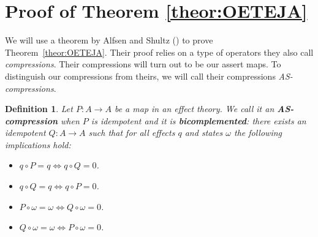 \documentclass[b5paper,onecolumn,12pt,accepted=2019-05-03, issue=1, volume=1, shorttitle=papers/compositionality-1-1]{compositionalityarticle}
\newcounter{counter}
\numberwithin{counter}{section}
\newtheorem{definition}[counter]{Definition}
\newcommand{\R}{\mathbb{R}}
\begin{document}

\section{Proof of Theorem \ref{theor:OETEJA}} \label{sec:proofofeja}


We will use a theorem by Alfsen and Shultz (\cite[Theorem 9.33]{alfsen2012geometry}) to prove Theorem~\ref{theor:OETEJA}. Their proof relies on a type of operators they also call \emph{compressions}. Their compressions will turn out to be our assert maps. To distinguish our compressions from theirs, we will call their compressions \emph{AS-compressions}.

\begin{definition}
    Let $P:A\rightarrow A$ be a map in an effect theory. We call it an \textbf{AS-compression} when $P$ is idempotent and it is \textbf{bicomplemented}: there exists an idempotent $Q:A\rightarrow A$ such that for all effects $q$ and states $\omega$ the following implications hold:
    \begin{itemize}
        \item $q\circ P = q \iff q\circ Q = 0$.
        \item $q\circ Q = q \iff q\circ P =0$.
        \item $P\circ \omega = \omega \iff Q\circ \omega = 0$.
        \item $Q\circ \omega = \omega \iff P\circ \omega =0$.
    \end{itemize}
\end{definition}
\end{document}
